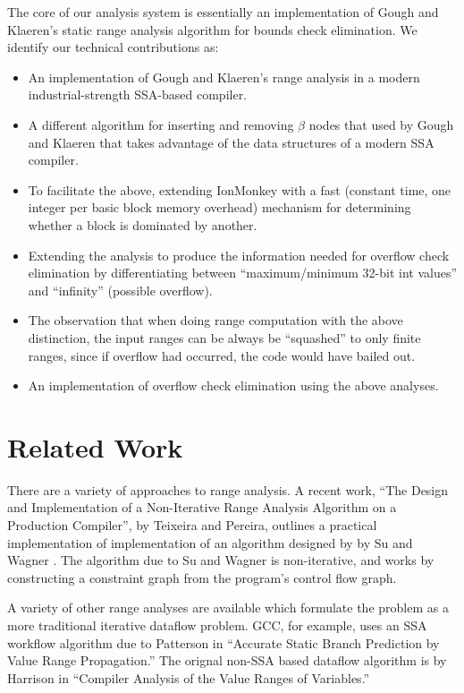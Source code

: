 \documentclass{article}
\begin{document}
The core of our analysis system is essentially an implementation of
Gough and Klaeren's static range analysis algorithm for bounds check
elimination.
We identify our technical contributions as:
\begin{itemize}
\item An implementation of Gough and Klaeren's range analysis in a
  modern industrial-strength SSA-based compiler.
\item A different algorithm for inserting and removing $\beta$ nodes
  that used by Gough and Klaeren that takes advantage of the data
  structures of a modern SSA compiler.
\item To facilitate the above, extending IonMonkey with a fast
  (constant time, one integer per basic block memory overhead) 
  mechanism for determining whether a block is dominated by another.
\item Extending the analysis to produce the information needed for
  overflow check elimination by differentiating between
  ``maximum/minimum 32-bit int values'' and ``infinity'' (possible
  overflow).
\item The observation that when doing range computation with the above
  distinction, the input ranges can be always be ``squashed'' to only
  finite ranges, since if overflow had occurred, the code would have
  bailed out.
\item An implementation of overflow check elimination using the above
  analyses.
\end{itemize}


\section{Related Work}
There are a variety of approaches to range analysis. A recent work, ``The Design
and Implementation of a Non-Iterative Range Analysis Algorithm on a
Production Compiler'', by Teixeira and Pereira, outlines a practical implementation of
implementation of an algorithm designed by by Su and Wagner
\cite{Su04aclass}. The algorithm due to Su and Wagner is
non-iterative, and works by constructing a constraint graph from the program's control flow graph.

A variety of other range analyses are available which formulate the problem as
a more traditional iterative dataflow problem. GCC, for example, uses an SSA
workflow algorithm due to Patterson in ``Accurate Static Branch Prediction by
Value Range Propagation.''\cite{Patterson95accuratestatic}
The orignal non-SSA based dataflow algorithm is by
Harrison in ``Compiler Analysis of the Value Ranges of Variables.''\cite{Harrison}
\end{document}
